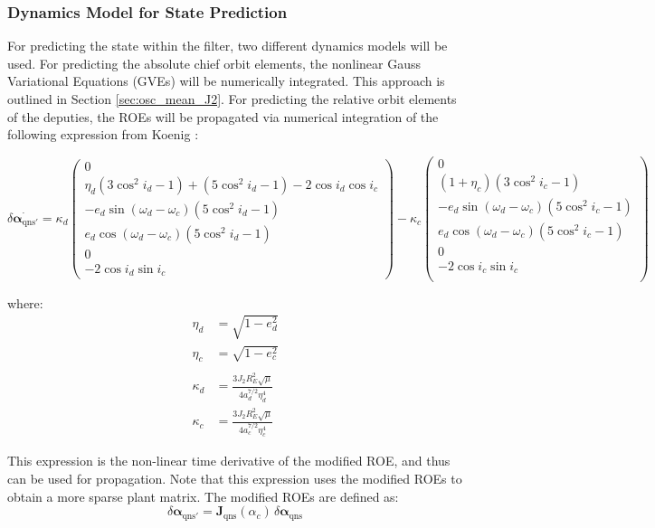 \subsubsection{Dynamics Model for State Prediction}
For predicting the state within the filter, two different dynamics models will be used. For predicting the absolute chief orbit elements, the nonlinear Gauss Variational Equations (GVEs) will be numerically integrated. This approach is outlined in Section \ref{sec:osc_mean_J2}. For predicting the relative orbit elements of the deputies, the ROEs will be propagated via numerical integration of the following expression from Koenig \cite{koenig2017new}:

\begin{equation}
\delta \dot{\boldsymbol{\alpha}_{\text{qns}'}} = 
\kappa_d
\begin{pmatrix}
0 \\
\eta_d(3\cos^2 i_d - 1) + (5\cos^2 i_d - 1) - 2\cos i_d \cos i_c \\
- e_d \sin(\omega_d - \omega_c)(5\cos^2 i_d - 1) \\
e_d \cos(\omega_d - \omega_c)(5\cos^2 i_d - 1) \\
0 \\
-2\cos i_d \sin i_c
\end{pmatrix}
-
\kappa_c
\begin{pmatrix}
0 \\
(1 + \eta_c)(3\cos^2 i_c - 1) \\
- e_d \sin(\omega_d - \omega_c)(5\cos^2 i_c - 1) \\
e_d \cos(\omega_d - \omega_c)(5\cos^2 i_c - 1) \\
0 \\
-2\cos i_c \sin i_c \\
\end{pmatrix}
\label{eq:ROE_nonlinear}
\end{equation}

where:
\begin{align*}
\eta_d &= \sqrt{1 - e_d^2} \\
\eta_c &= \sqrt{1 - e_c^2} \\
\\
\kappa_d &= \frac{3 J_2 R_E^2 \sqrt{\mu}}{4 a_d^{7/2} \eta_d^4} \\
\kappa_c &= \frac{3 J_2 R_E^2 \sqrt{\mu}}{4 a_c^{7/2} \eta_c^4}
\end{align*}

This expression is the non-linear time derivative of the modified ROE, and thus can be used for propagation. Note that this expression uses the modified ROEs to obtain a more sparse plant matrix. The modified ROEs are defined as:
\begin{equation}
\delta \boldsymbol{\alpha}_{\text{qns}'} = \mathbf{J}_{\text{qns}}(\alpha_c) \, \delta \boldsymbol{\alpha}_{\text{qns}}
\end{equation}

